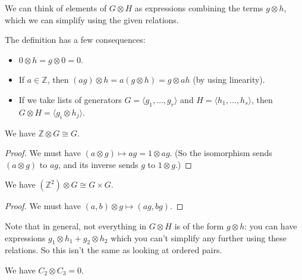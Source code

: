We can think of elements of $G \otimes H$ as expressions combining the terms $g \otimes h$, which we can simplify using the given relations. 

\begin{proposition}
The definition has a few consequences:
\begin{itemize}
    \item $0 \otimes h = g \otimes 0 = 0$.
    \item If $a \in \mathbb{Z}$, then $(ag) \otimes h = a(g \otimes h) = g \otimes ah$ (by using linearity). 
    \item If we take lists of generators $G = \langle g_1, \ldots, g_r\rangle$ and $H = \langle h_1, \ldots, h_s\rangle$, then $G \otimes H = \langle g_i \otimes h_j \rangle$.
\end{itemize}
\end{proposition}

\begin{example}
    We have $\mathbb{Z} \otimes G \cong G$. 
\end{example}

\begin{proof}
    We must have $(a \otimes g) \mapsto ag = 1 \otimes ag$. (So the isomorphism sends $(a \otimes g)$ to $ag$, and its inverse sends $g$ to $1 \otimes g$.)
\end{proof}

\begin{example}
    We have $(\mathbb{Z}^2) \otimes G \cong G \times G$. 
\end{example}

\begin{proof}
    We must have $(a, b) \otimes g \mapsto (ag, bg)$. 
\end{proof}



Note that in general, not everything in $G \otimes H$ is of the form $g \otimes h$: you can have expressions $g_1 \otimes h_1 + g_2 \otimes h_2$ which you can't simplify any further using these relations. So this isn't the same as looking at ordered pairs. 

\begin{example}
    We have $C_2 \otimes C_3 = 0$. 
\end{example}

